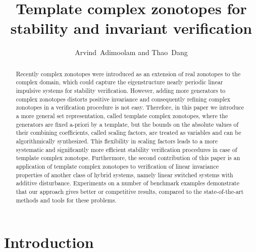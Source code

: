




\title{Template complex zonotopes for stability and invariant
  verification} 
\author{Arvind\ Adimoolam and Thao\ Dang
} 



\maketitle


\begin{abstract}
Recently complex zonotopes were introduced as an extension of real
zonotopes to the complex domain, which could capture the eigenstructure
nearly periodic linear impulsive systems for stability
verification. %
However, adding more generators to complex zonotopes distorts positive
invariance and consequently refining complex zonotopes in a verification
procedure is not easy. Therefore, in this paper we introduce a more
general set representation, called template complex zonotopes, where
the generators are fixed a-priori by a template, but the bounds on the
absolute values of their combining coefficients, called scaling
factors, are treated as variables and can be algorithmically
synthesized. %
This flexibility in scaling factors leads to a more systematic and
significantly more efficient stability verification procedures in case
of template complex zonotope. Furthermore, the second contribution of
this paper is an application of template complex zonotopes to
verification of linear invariance properties of another class of
hybrid systems, namely linear switched systems with additive
disturbance. Experiments on a number of benchmark examples demonstrate
that our approach gives better or competitive results, compared to the
state-of-the-art methods and tools for these problems.
\end{abstract}

\section{Introduction}


 

  



